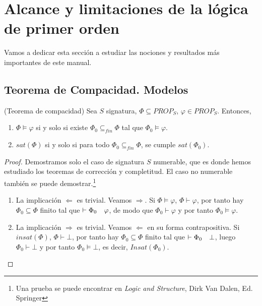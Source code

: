 \chapter{Alcance y limitaciones de la lógica de primer orden}


Vamos a dedicar esta sección a estudiar las nociones y resultados más importantes de este manual.


\section{Teorema de Compacidad. Modelos}

\begin{theorem}\label{comp2} (Teorema de compacidad)
Sea $S$ signatura, $\Phi\subseteq PROP_S$, $\varphi\in PROP_S$. Entonces,
\begin{enumerate}[label=\alph*)]
    \item $\Phi\vDash\varphi$ si y solo si existe $\Phi_0\subseteq_{fin}\Phi$ tal que $\Phi_0\vDash\varphi$.
    \item $sat(\Phi)$ si y solo si para todo $\Phi_0\subseteq_{fin}\Phi$, se cumple $sat(\Phi_0)$.
\end{enumerate}
\end{theorem}

\begin{proof}
Demostramos solo el caso de signatura $S$ numerable, que es donde hemos estudiado los teoremas de corrección y completitud. El caso no numerable también se puede demostrar.\footnote{Una prueba se puede encontrar en \textit{Logic and Structure}, Dirk Van Dalen, Ed. Springer}
\begin{enumerate}[label=\alph*)]

\item  La implicación $\Longleftarrow$ es trivial. Veamos $\Longrightarrow$. Si $\Phi\vDash\varphi$, $\Phi\vdash\varphi$, por tanto hay $\Phi_0\subseteq\Phi$ finito tal que $\vdash\Phi_0\quad\varphi$, de modo que $\Phi_0\vdash\varphi$ y por tanto $\Phi_0\vDash\varphi$.

\item  La implicación $\Longrightarrow$ es trivial. Veamos $\Longleftarrow$ en su forma contrapositiva. Si $insat(\Phi)$, $\Phi\vdash\bot$, por tanto hay $\Phi_0\subseteq\Phi$ finito tal que $\vdash\Phi_0\quad\bot$, luego $\Phi_0\vdash\bot$ y por tanto $\Phi_0\vDash\bot$, es decir, $Insat(\Phi_0)$.
\end{enumerate}
\end{proof}



